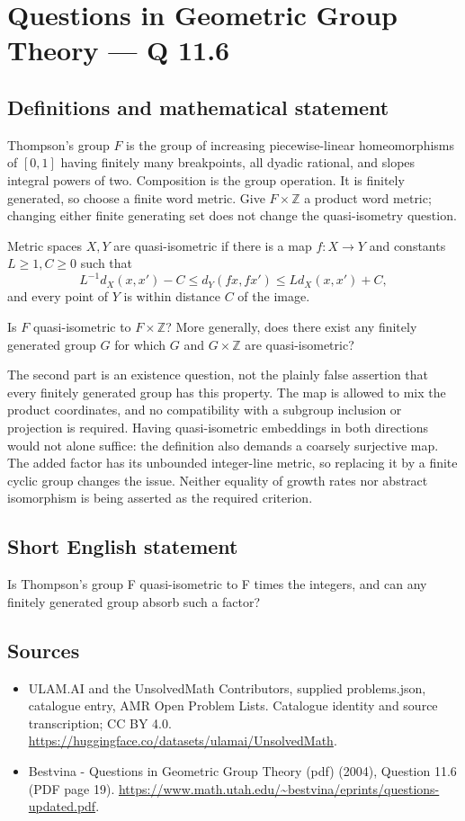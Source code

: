 \documentclass[11pt,a4paper]{article}
\begin{document}
\section*{Questions in Geometric Group Theory — Q 11.6}\label{statement}

\subsection{Definitions and mathematical statement}
Thompson's group $F$ is the group of increasing piecewise-linear homeomorphisms of $[0,1]$ having finitely many breakpoints, all dyadic rational, and slopes integral powers of two. Composition is the group operation. It is finitely generated, so choose a finite word metric. Give $F\times\mathbb Z$ a product word metric; changing either finite generating set does not change the quasi-isometry question.

Metric spaces $X,Y$ are quasi-isometric if there is a map $f:X\to Y$ and constants $L\geq1,C\geq0$ such that
\[
 L^{-1}d_X(x,x')-C\leq d_Y(fx,fx')\leq Ld_X(x,x')+C,
\]
and every point of $Y$ is within distance $C$ of the image.

Is $F$ quasi-isometric to $F\times\mathbb Z$? More generally, does there exist any finitely generated group $G$ for which $G$ and $G\times\mathbb Z$ are quasi-isometric?

The second part is an existence question, not the plainly false assertion that every finitely generated group has this property. The map is allowed to mix the product coordinates, and no compatibility with a subgroup inclusion or projection is required. Having quasi-isometric embeddings in both directions would not alone suffice: the definition also demands a coarsely surjective map. The added factor has its unbounded integer-line metric, so replacing it by a finite cyclic group changes the issue. Neither equality of growth rates nor abstract isomorphism is being asserted as the required criterion.
\subsection{Short English statement}
Is Thompson’s group F quasi-isometric to F times the integers, and can any finitely generated group absorb such a factor?
\subsection{Sources}
\begin{itemize}
\item[S1] ULAM.AI and the UnsolvedMath Contributors, supplied problems.json, catalogue entry, AMR Open Problem Lists. Catalogue identity and source transcription; CC BY 4.0.
\url{https://huggingface.co/datasets/ulamai/UnsolvedMath}.
\item[S2] Bestvina - Questions in Geometric Group Theory (pdf) (2004), Question 11.6 (PDF page 19). 
\url{https://www.math.utah.edu/~bestvina/eprints/questions-updated.pdf}.
\end{itemize}
\end{document}
